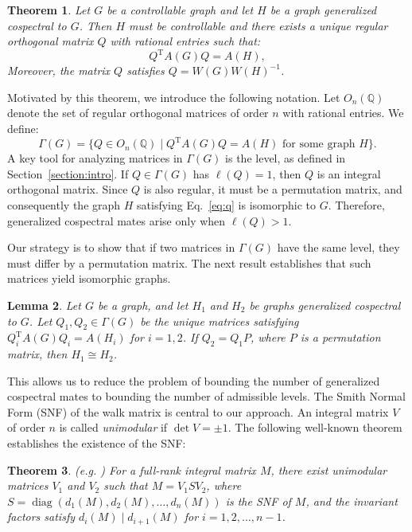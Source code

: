 \documentclass[12pt]{article}
\theoremstyle{plain}
\newtheorem{theorem}{Theorem}[section]
\newtheorem{lemma}[theorem]{Lemma}
\theoremstyle{definition}
\newcommand{\trans}{^{\mathrm{T}}}
\begin{document}
\begin{theorem}
\label{theorem:q}
\cite{wang2006sufficient} Let $G$ be a controllable graph and let $H$ be a graph generalized cospectral to $G$. Then $H$ must be controllable and there exists a unique regular orthogonal matrix $Q$ with rational entries such that:
\begin{equation}
\label{eq:q}
Q\trans A(G) Q = A(H),
\end{equation}
Moreover, the matrix $Q$ satisfies $Q=W(G) W(H)^{-1}$.
\end{theorem}

Motivated by this theorem, we introduce the following notation. Let $O_n(\mathbb{Q})$ denote the set of regular orthogonal matrices of order $n$ with rational entries. We define:
\begin{equation*}
\Gamma(G) = \{Q \in O_n(\mathbb{Q}) \mid Q\trans A(G) Q = A(H) \text{ for some graph } H\}.
\end{equation*}
A key tool for analyzing matrices in $\Gamma(G)$ is the level, as defined in Section~\ref{section:intro}. If $Q \in \Gamma(G)$ has $\ell(Q) = 1$, then $Q$ is an integral orthogonal matrix. Since $Q$ is also regular, it must be a permutation matrix, and consequently the graph $H$ satisfying Eq.~\eqref{eq:q} is isomorphic to $G$. Therefore, generalized cospectral mates arise only when $\ell(Q) > 1$.

Our strategy is to show that if two matrices in $\Gamma(G)$ have the same level, they must differ by a permutation matrix. The next result establishes that such matrices yield isomorphic graphs.

\begin{lemma}\cite{raza2025upper, wang2023graphs}
\label{lemma:permutation-matrix}
Let $G$ be a graph, and let $H_1$ and $H_2$ be graphs generalized cospectral to $G$. Let $Q_1, Q_2 \in \Gamma(G)$ be the unique matrices satisfying $Q_i\trans A(G) Q_i = A(H_i)$ for $i=1,2$. If $Q_2 = Q_1 P$, where $P$ is a permutation matrix, then $H_1 \cong H_2$.
\end{lemma}

This allows us to reduce the problem of bounding the number of generalized cospectral mates to bounding the number of admissible levels. The Smith Normal Form (SNF) of the walk matrix is central to our approach. An integral matrix $V$ of order $n$ is called \emph{unimodular} if $\det{V} = \pm 1$. The following well-known theorem establishes the existence of the SNF:

\begin{theorem}
(e.g. \cite{schrijver1998book})
For a full-rank integral matrix $M$, there exist unimodular matrices $V_1$ and $V_2$ such that $M = V_1 S V_2$, where $S = \operatorname{diag}(d_1(M), d_2(M), \ldots, d_n(M))$ is the SNF of $M$, and the invariant factors satisfy $d_i(M) \mid d_{i+1}(M)$ for $i = 1, 2, \ldots, n-1$.
\end{theorem}
\end{document}
